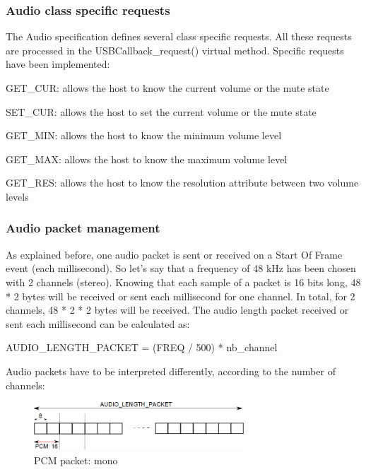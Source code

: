 \documentclass[pdftex,10pt,a4paper]{report}
\newenvironment{packed_item}{
\begin{itemize}
  \setlength{\itemsep}{1pt}
  \setlength{\parskip}{0pt}
  \setlength{\parsep}{0pt}
}{\end{itemize}}
\begin{document}
\subsubsection{Audio class specific requests}
The Audio specification defines several class specific requests. All these requests are processed in the USBCallback\_request() virtual method. Specific requests have been implemented:
\begin{packed_item}
	\item GET\_CUR: allows the host to know the current volume or the mute state
	\item SET\_CUR: allows the host to set the current volume or the mute state
	\item GET\_MIN: allows the host to know the minimum volume level
	\item GET\_MAX: allows the host to know the maximum volume level
	\item GET\_RES: allows the host to know the resolution attribute between two volume levels
\end{packed_item}

\subsubsection{Audio packet management}
As explained before, one audio packet is sent or received on a Start Of Frame event (each millisecond). So let's say that a frequency of 48 kHz has been chosen with 2 channels (stereo). Knowing that each sample of a packet is 16 bits long, 48 * 2 bytes will be received or sent each millisecond for one channel. In total, for 2 channels, 48 * 2 * 2 bytes will be received. The audio length packet received or sent each millisecond can be calculated as:
\begin{center}
	AUDIO\_LENGTH\_PACKET = (FREQ / 500) * nb\_channel
\end{center}

Audio packets have to be interpreted differently, according to the number of channels:

\begin{figure}[h!]
		\centering
		\includegraphics[width=0.7\textwidth]{./pcm.png}
		\caption{PCM packet: mono}
		\label{PCM packet: mono}
\end{figure}
\end{document}
